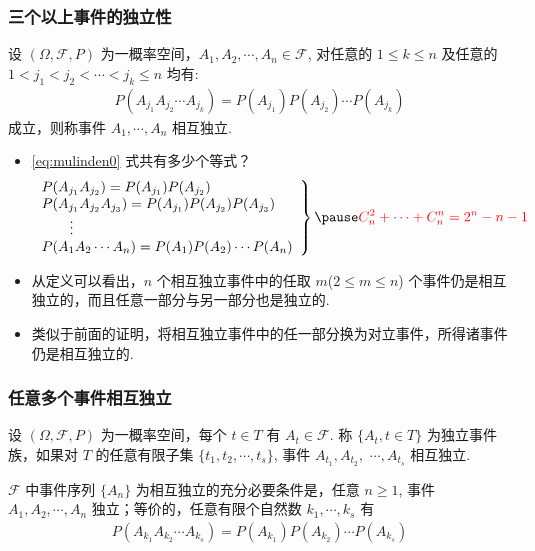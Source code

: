 \documentclass[Prob-All.tex]{subfiles}
\begin{document}
\begin{frame}
	\frametitle{三个以上事件的独立性}
	\begin{defi}
		设 $(\Omega,\mathcal{F}, P)$ 为一概率空间，$A_1,A_2,\cdots,A_n\in\mathcal{F}$, 对任意的 $1\le k\le n$ 及任意的 $1< j_1<j_2<\cdots<j_k\leq n$ 均有:
		\begin{eqnarray}\label{eq:mulinden0}
			P(A_{j_1}A_{j_2}\cdots A_{j_k})=P(A_{j_1})P(A_{j_2})\cdots P(A_{j_k})
		\end{eqnarray}
		成立，则称事件 $A_1,\cdots, A_n$ 相互独立.
	\end{defi}
	\pause
	\begin{itemize}[<+-|alert@+>]
		\item \eqref{eq:mulinden0} 式共有多少个等式？\pause
		\begin{eqnarray}
			\label{eq:mulinden}
			\left.\begin{array}{l}
				P(A_{j_1}A_{j_2})=P(A_{j_1})P(A_{j_2})\\
				P(A_{j_1}A_{j_2}A_{j_3})=P(A_{j_1})P(A_{j_2})P(A_{j_3}) \\
				\qquad \vdots\\
				P(A_1A_2\cdots A_n)=P(A_1)P(A_2)\cdots P(A_n)
			\end{array}\right\} \pause \textcolor{red}{C_n^2+\cdots+C_n^n=2^n-n-1}
		\end{eqnarray}
		\pause
		\item 从定义可以看出，$n$ 个相互独立事件中的任取 $m$($2\le m\le n$) 个事件仍是相互独立的，而且任意一部分与另一部分也是独立的.
		\item 类似于前面的证明，将相互独立事件中的任一部分换为对立事件，所得诸事件仍是相互独立的.
	\end{itemize}



\end{frame}

\begin{frame}
	\frametitle{任意多个事件相互独立}
	\begin{defi}
		设 $(\Omega,\mathcal{F}, P)$ 为一概率空间，每个 $t\in T$ 有 $A_t\in \mathcal{F}$. 称 $\{A_t, t\in T\}$ 为独立事件族，如果对 $T$ 的任意有限子集 $\{t_1,t_2,\cdots, t_s\}$, 事件 $A_{t_1}, A_{t_2},$ $\cdots, A_{t_s}$ 相互独立.
	\end{defi}


	\vspace{0.8cm}
	\pause
	\begin{exam}
		$\mathcal{F}$ 中事件序列 $\{A_n\}$ 为相互独立的充分必要条件是，任意 $n\geq 1$, 事件 $A_1,A_2, \cdots, A_n$ 独立；等价的，任意有限个自然数 $k_1,\cdots, k_s$ 有
		\begin{eqnarray*}
			P(A_{k_1}A_{k_2}\cdots A_{k_s})=P(A_{k_1})P(A_{k_2})\cdots P(A_{k_s})
		\end{eqnarray*}

	\end{exam}

\end{frame}
\end{document}
